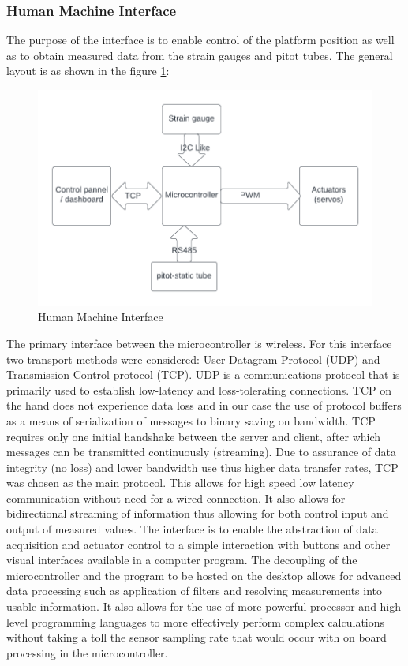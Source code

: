 \subsubsection{Human Machine Interface}
The purpose of the interface is to enable control of the platform position as well as to obtain measured data from the strain gauges and pitot tubes. 
The general layout is as shown in the figure \ref{fig:hmi}:
\begin{center}
\begin{figure}[H]
\centering
\includegraphics{Figures/Interface}
\caption[Human Machine Interface]{Human Machine Interface}
\label{fig:hmi}
\end{figure}
\end{center}

The primary interface between the microcontroller is wireless. 
For this interface two transport methods were considered: User Datagram Protocol (UDP) and Transmission Control protocol (TCP).
UDP is a communications protocol that is primarily used to establish low-latency and loss-tolerating connections.
 TCP on the hand does not experience data loss and in our case the use of protocol buffers as a means of serialization of messages to binary saving on bandwidth. 
 TCP requires only one initial handshake between the server and client, after which messages can be transmitted continuously (streaming).
 Due to assurance of data integrity (no loss) and lower bandwidth use thus higher data transfer rates, TCP was chosen as the main protocol.
  This allows for high speed low latency communication without need for a wired connection. It also allows for bidirectional streaming of information thus allowing for both control input and output of measured values. The interface is to enable the abstraction of data acquisition and actuator control to a simple interaction with buttons and other visual interfaces available in a computer program.
The decoupling of the microcontroller and the program to be hosted on the desktop allows for advanced data processing such as application of filters and resolving measurements into usable information. It also allows for the use of more powerful processor and high level programming languages to more effectively perform complex calculations without taking a toll the sensor sampling rate that would occur with on board processing in the microcontroller.

